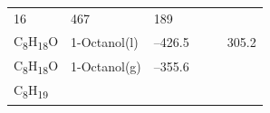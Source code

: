 \documentclass[
  9pt,
]{extbook}
\theoremstyle{definition}
\theoremstyle{definition}
\theoremstyle{definition}
\theoremstyle{remark}
\begin{document}
\begin{longtable}[]{@{}llllll@{}}
\begin{minipage}[t]{0.15\columnwidth}
16\strut
\end{minipage} & \begin{minipage}[t]{0.14\columnwidth}\raggedright
467\strut
\end{minipage} & \begin{minipage}[t]{0.14\columnwidth}\raggedright
189\strut
\end{minipage}\tabularnewline
\begin{minipage}[t]{0.07\columnwidth}\raggedright
C\textsubscript{8}H\textsubscript{18}O\strut
\end{minipage} & \begin{minipage}[t]{0.17\columnwidth}\raggedright
1-Octanol(l)\strut
\end{minipage} & \begin{minipage}[t]{0.15\columnwidth}\raggedright
--426.5\strut
\end{minipage} & \begin{minipage}[t]{0.15\columnwidth}\raggedright
\strut
\end{minipage} & \begin{minipage}[t]{0.14\columnwidth}\raggedright
\strut
\end{minipage} & \begin{minipage}[t]{0.14\columnwidth}\raggedright
305.2\strut
\end{minipage}\tabularnewline
\begin{minipage}[t]{0.07\columnwidth}\raggedright
C\textsubscript{8}H\textsubscript{18}O\strut
\end{minipage} & \begin{minipage}[t]{0.17\columnwidth}\raggedright
1-Octanol(g)\strut
\end{minipage} & \begin{minipage}[t]{0.15\columnwidth}\raggedright
--355.6\strut
\end{minipage} & \begin{minipage}[t]{0.15\columnwidth}\raggedright
\strut
\end{minipage} & \begin{minipage}[t]{0.14\columnwidth}\raggedright
\strut
\end{minipage} & \begin{minipage}[t]{0.14\columnwidth}\raggedright
\strut
\end{minipage}\tabularnewline
\begin{minipage}[t]{0.07\columnwidth}\raggedright
C\textsubscript{8}H\textsubscript{19}\strut
\end{minipage} & \begin{minipage}[t]{0.17\columnwidth}\raggedright

\end{minipage}
\end{longtable}
\end{document}

